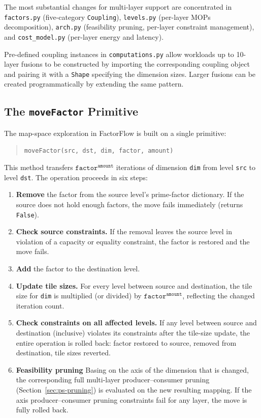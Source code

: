 \noindent
The most substantial changes for multi-layer support are concentrated
in \texttt{factors.py} (five-category \texttt{Coupling}),
\texttt{levels.py} (per-layer MOPs decomposition),
\texttt{arch.py} (feasibility pruning, per-layer constraint
management), and \texttt{cost\_model.py} (per-layer energy and
latency).

Pre-defined coupling instances in \texttt{computations.py} allow
workloads up to 10-layer fusions to be constructed by importing the
corresponding coupling object and pairing it with a \texttt{Shape}
specifying the dimension sizes.
Larger fusions can be created programmatically by extending the same
pattern.


\subsection{The \texttt{moveFactor} Primitive}
\label{sec:ps-movefactor}

The map-space exploration in FactorFlow is built on a single
primitive:

\begin{quote}
\texttt{moveFactor(src, dst, dim, factor, amount)}
\end{quote}

\noindent
This method transfers $\texttt{factor}^{\texttt{amount}}$ iterations
of dimension \texttt{dim} from level \texttt{src} to level
\texttt{dst}.
The operation proceeds in six steps:

\begin{enumerate}
  \item \textbf{Remove} the factor from the source level's
        prime-factor dictionary.
        If the source does not hold enough factors, the move fails
        immediately (returns \texttt{False}).
  \item \textbf{Check source constraints.}
        If the removal leaves the source level in violation of a
        capacity or equality constraint, the factor is restored and
        the move fails.
  \item \textbf{Add} the factor to the destination level.
  \item \textbf{Update tile sizes.}
        For every level between source and destination, the tile size
        for \texttt{dim} is multiplied (or divided) by
        $\texttt{factor}^{\texttt{amount}}$, reflecting the changed
        iteration count.
  \item \textbf{Check constraints on all affected levels.}
        If any level between source and destination (inclusive)
        violates its constraints after the tile-size update, the
        entire operation is rolled back: factor restored to source,
        removed from destination, tile sizes reverted.
  \item \textbf{Feasibility pruning} 
        Basing on the axis of the dimension that is changed,  
        the corresponding full multi-layer producer--consumer pruning
        (Section~\ref{sec:ps-pruning}) is evaluated on the new
        resulting mapping.
        If the axis producer--consumer pruning constraints fail for any layer, the move is fully rolled back.
\end{enumerate}

